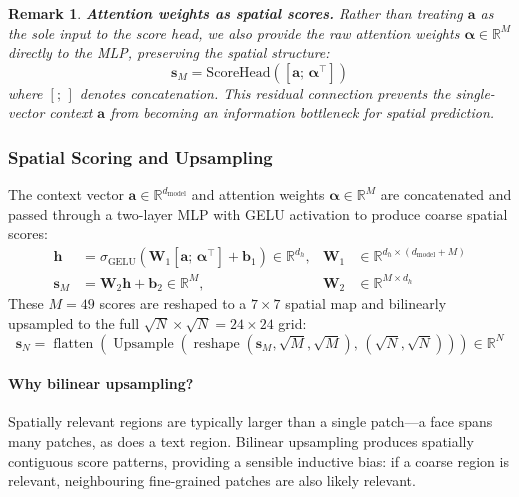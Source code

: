 \documentclass[12pt,a4paper]{article}
\DeclareMathOperator{\Upsample}{Upsample}
\DeclareMathOperator{\reshape}{reshape}
\DeclareMathOperator{\flatten}{flatten}
\newcommand{\R}{\mathbb{R}}
\newcommand{\vs}{\mathbf{s}}     %
\newtheorem{remark}{Remark}
\begin{document}
\begin{remark}
  \textbf{Attention weights as spatial scores.}
  Rather than treating $\mathbf{a}$ as the sole input to the score head,
  we also provide the raw attention weights $\boldsymbol{\alpha} \in \R^M$
  directly to the MLP, preserving the spatial structure:
  \[
    \vs_M = \mathrm{ScoreHead}([\mathbf{a};\, \boldsymbol{\alpha}^\top])
  \]
  where $[;\,]$ denotes concatenation. This residual connection prevents the
  single-vector context $\mathbf{a}$ from becoming an information bottleneck
  for spatial prediction.
\end{remark}

\subsubsection{Spatial Scoring and Upsampling}

\begin{mathbox}[title={Spatial Score Computation}]
The context vector $\mathbf{a} \in \R^{d_{\mathrm{model}}}$ and attention
weights $\boldsymbol{\alpha} \in \R^M$ are concatenated and passed through a
two-layer MLP with GELU activation to produce coarse spatial scores:
\begin{align}
  \mathbf{h} &= \sigma_{\mathrm{GELU}}(\mathbf{W}_1
    [\mathbf{a};\, \boldsymbol{\alpha}^\top] + \mathbf{b}_1) \in \R^{d_h},
    & \mathbf{W}_1 &\in \R^{d_h \times (d_{\mathrm{model}} + M)}
    \label{eq:mlp_hidden} \\
  \vs_M &= \mathbf{W}_2 \mathbf{h} + \mathbf{b}_2 \in \R^M,
    & \mathbf{W}_2 &\in \R^{M \times d_h}
    \label{eq:mlp_output}
\end{align}
These $M = 49$ scores are reshaped to a $7 \times 7$ spatial map and bilinearly
upsampled to the full $\sqrt{N} \times \sqrt{N} = 24 \times 24$ grid:
\begin{equation}
  \vs_N = \flatten\!\left(
    \Upsample\!\left(\reshape(\vs_M, \sqrt{M}, \sqrt{M}),\,
      (\sqrt{N}, \sqrt{N})\right)\right) \in \R^N
  \label{eq:upsample}
\end{equation}
\end{mathbox}

\paragraph{Why bilinear upsampling?}
Spatially relevant regions are typically larger than a single patch---a face
spans many patches, as does a text region. Bilinear upsampling produces spatially
contiguous score patterns, providing a sensible inductive bias: if a coarse
region is relevant, neighbouring fine-grained patches are also likely relevant.
\end{document}
